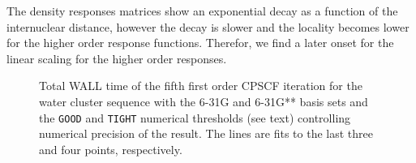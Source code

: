 \documentclass[twocolumn,showpacs,preprintnumbers,amsmath,amssymb]{revtex4}
\begin{document}
The density responses matrices show an exponential decay as a function
of the internuclear distance, however the decay is slower and the locality
becomes lower for the higher order response functions.
Therefor, we find a later onset for the linear scaling for the higher order
responses.



\begin{figure}[t]
  \caption{\protect
    Total WALL time of the fifth first order CPSCF iteration for
    the water cluster sequence with the 6-31G and 6-31G** 
    basis sets and the {\tt GOOD} and {\tt TIGHT} 
    numerical thresholds (see text) controlling numerical
    precision of the result. The lines are fits to the 
    last three and four points, respectively.
  }\label{Alpha_scaling}
\end{figure}
\end{document}
